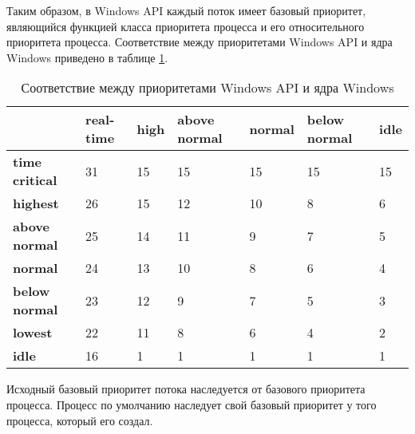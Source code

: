 Таким образом, в Windows API каждый поток имеет базовый приоритет,
являющийся функцией класса приоритета процесса и его относительного приоритета процесса. Соответствие между приоритетами Windows API и ядра Windows приведено в таблице \ref{tbl:priority}.
\pagebreak
\begin{table}[h]
	\caption{Соответствие между приоритетами Windows API и ядра Windows}
	\begin{center}
		\begin{tabular}{|l|p{45pt}|p{45pt}|p{45pt}|p{45pt}|p{45pt}|p{45pt}|} 
			\hline
			{} & \textbf{real-time} & \textbf{high} & \textbf{above normal} & \textbf{normal} & \textbf{below normal} & \textbf{idle}\\
			\hline
			\textbf{time critical} & 31 & 15 & 15 & 15 & 15 & 15 \\
			\hline
			\textbf{highest} & 26 & 15 & 12 & 10 & 8 & 6 \\
			\hline
			\textbf{above normal} & 25 & 14 & 11 & 9 & 7 & 5 \\
			\hline
			\textbf{normal} & 24 & 13 & 10 & 8 & 6 & 4 \\
			\hline
			\textbf{below normal} & 23 & 12 & 9 & 7 & 5 & 3 \\
			\hline
			\textbf{lowest} & 22 & 11 & 8 & 6 & 4 & 2 \\
			\hline
			\textbf{idle} & 16 & 1 & 1 & 1 & 1 & 1 \\
			\hline
		\end{tabular}
	\end{center}
	\label{tbl:priority}
\end{table}

Исходный базовый приоритет потока наследуется от базового приоритета процесса. Процесс по умолчанию наследует свой базовый приоритет у того процесса, который его создал.

